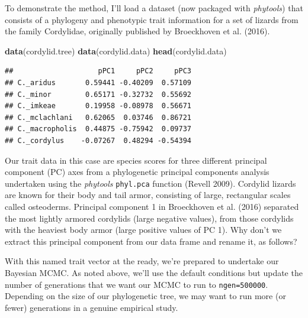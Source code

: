\documentclass[fleqn,10pt,lineno]{wlpeerj}
\newenvironment{Shaded}{\begin{snugshade}}{\end{snugshade}}
\newcommand{\FunctionTok}[1]{\textcolor[rgb]{0.13,0.29,0.53}{\textbf{#1}}}
\newcommand{\NormalTok}[1]{#1}
\newcommand{\OtherTok}[1]{\textcolor[rgb]{0.56,0.35,0.01}{#1}}
\newcommand{\SpecialCharTok}[1]{\textcolor[rgb]{0.81,0.36,0.00}{\textbf{#1}}}
\providecommand{\DIFaddtex}[1]{{\protect\color{blue}\uwave{#1}}} %
\providecommand{\DIFdeltex}[1]{{\protect\color{red}\sout{#1}}}                      %
\providecommand{\DIFaddbegin}{} %
\providecommand{\DIFaddend}{} %
\providecommand{\DIFdelbegin}{} %
\providecommand{\DIFdelend}{} %
\providecommand{\DIFadd}[1]{\texorpdfstring{\DIFaddtex{#1}}{#1}} %
\providecommand{\DIFdel}[1]{\texorpdfstring{\DIFdeltex{#1}}{}} %
\newcommand{\DIFscaledelfig}{0.5}
\newlength{\DIFdelgraphicswidth} %
\newlength{\DIFdelgraphicsheight} %
\newcommand{\DIFaddincludegraphics}[2][]{{\color{blue}\fbox{\DIFOincludegraphics[#1]{#2}}}} %
\newcommand{\DIFdelincludegraphics}[2][]{%
\sbox{\DIFdelgraphicsbox}{\DIFOincludegraphics[#1]{#2}}%
\settoboxwidth{\DIFdelgraphicswidth}{\DIFdelgraphicsbox} %
\settoboxtotalheight{\DIFdelgraphicsheight}{\DIFdelgraphicsbox} %
\scalebox{\DIFscaledelfig}{%
\parbox[b]{\DIFdelgraphicswidth}{\usebox{\DIFdelgraphicsbox}\\[-\baselineskip] \rule{\DIFdelgraphicswidth}{0em}}\llap{\resizebox{\DIFdelgraphicswidth}{\DIFdelgraphicsheight}{%
\setlength{\unitlength}{\DIFdelgraphicswidth}%
\begin{picture}(1,1)%
\thicklines\linethickness{2pt} %
{\color[rgb]{1,0,0}\put(0,0){\framebox(1,1){}}}%
{\color[rgb]{1,0,0}\put(0,0){\line( 1,1){1}}}%
{\color[rgb]{1,0,0}\put(0,1){\line(1,-1){1}}}%
\end{picture}%
}\hspace*{3pt}}} %
} %
\DeclareRobustCommand{\DIFaddbegin}{\DIFOaddbegin \let\includegraphics\DIFaddincludegraphics} %
\DeclareRobustCommand{\DIFaddend}{\DIFOaddend \let\includegraphics\DIFOincludegraphics} %
\DeclareRobustCommand{\DIFdelbegin}{\DIFOdelbegin \let\includegraphics\DIFdelincludegraphics} %
\DeclareRobustCommand{\DIFdelend}{\DIFOaddend \let\includegraphics\DIFOincludegraphics} %
\begin{document}
To demonstrate the method, I'll load a dataset (now packaged with
\emph{phytools}) that consists of a phylogeny and phenotypic trait
information for a set of lizards from the family Cordylidae, originally
published by Broeckhoven et al. (2016).

\begin{Shaded}
\begin{Highlighting}[]
\FunctionTok{data}\NormalTok{(cordylid.tree)}
\FunctionTok{data}\NormalTok{(cordylid.data)}
\FunctionTok{head}\NormalTok{(cordylid.data)}
\end{Highlighting}
\end{Shaded}

\begin{verbatim}
##                    pPC1     pPC2     pPC3
## C._aridus       0.59441 -0.40209  0.57109
## C._minor        0.65171 -0.32732  0.55692
## C._imkeae       0.19958 -0.08978  0.56671
## C._mclachlani   0.62065  0.03746  0.86721
## C._macropholis  0.44875 -0.75942  0.09737
## C._cordylus    -0.07267  0.48294 -0.54394
\end{verbatim}

Our trait data in this case are species scores for three different
principal component (PC) axes from a phylogenetic principal components
analysis undertaken using the \emph{phytools} \texttt{phyl.pca} function
(Revell 2009). Cordylid lizards are known for their body and tail armor,
consisting of large, rectangular scales called osteoderms. Principal
component 1 in Broeckhoven et al. (2016) separated the most lightly
armored cordylids (large negative values), from those cordylids with the
heaviest body armor (large positive values of PC 1). Why don't we
extract this principal component from our data frame and rename it, as
follows?

\begin{Shaded}
\end{Shaded}

With this named trait vector at the ready, we're prepared to undertake
our Bayesian MCMC. As noted above, we'll use the default conditions but
update the number of generations that we want our MCMC to run to
\texttt{ngen=500000}. Depending on the size of our phylogenetic tree, we
may want to run more (or fewer) generations in a genuine empirical
study.
\end{document}
